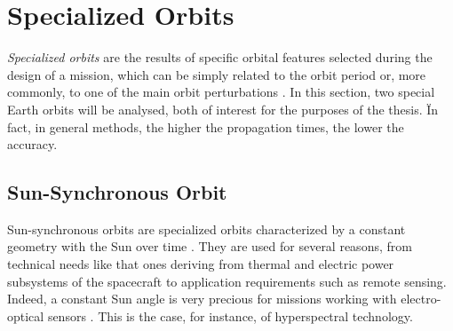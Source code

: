 \section{Specialized Orbits}
\textit{Specialized orbits} are the results of specific orbital features selected during the design of a mission, which can be simply related to the orbit period or, more commonly, to one of the main orbit perturbations \cite{wertz2009orbit}. 
In this section, two special Earth orbits will be analysed, both of interest for the purposes of the thesis.
Ïn fact, in general methods, the higher the propagation times, the lower the accuracy.

\subsection{Sun-Synchronous Orbit} \label{sso_paragraph}
Sun-synchronous orbits are specialized orbits characterized by a constant geometry with the Sun over time \cite{vallado2013fundamentals}. 
They are used for several reasons, from technical needs like that ones deriving from thermal and electric power subsystems of the spacecraft to application requirements such as remote sensing.
Indeed, a constant Sun angle is very precious for missions working with electro-optical sensors \cite{brown1998spacecraft}.
This is the case, for instance, of hyperspectral technology. 

